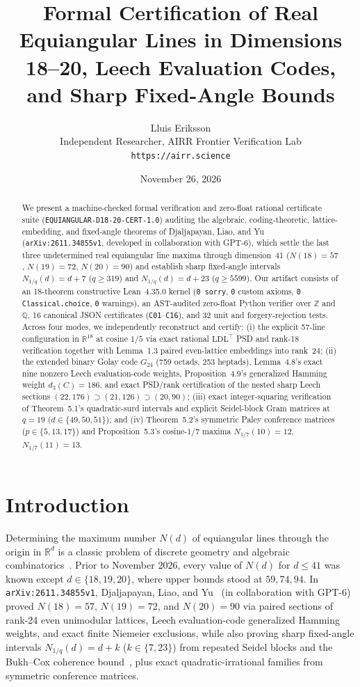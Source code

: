 \documentclass[10pt,twocolumn]{article}
\title{\textbf{Formal Certification of Real Equiangular Lines in Dimensions 18--20, Leech Evaluation Codes, and Sharp Fixed-Angle Bounds}}
\author{Lluis Eriksson\\
\small Independent Researcher, AIRR Frontier Verification Lab\\
\small \texttt{https://airr.science}}
\date{November 26, 2026}
\begin{document}
\maketitle

\begin{abstract}
We present a machine-checked formal verification and zero-float rational certificate suite (\texttt{EQUIANGULAR-D18-20-CERT-1.0}) auditing the algebraic, coding-theoretic, lattice-embedding, and fixed-angle theorems of Djaljapayan, Liao, and Yu (\texttt{arXiv:2611.34855v1}, developed in collaboration with GPT-6), which settle the last three undetermined real equiangular line maxima through dimension~41 ($N(18)=57$, $N(19)=72$, $N(20)=90$) and establish sharp fixed-angle intervals $N_{1/q}(d)=d+7$ ($q\geq 319$) and $N_{1/q}(d)=d+23$ ($q\geq 5599$). Our artifact consists of an 18-theorem constructive Lean~4.35.0 kernel (\texttt{0 sorry}, \texttt{0} custom axioms, \texttt{0 Classical.choice}, \texttt{0} warnings), an AST-audited zero-float Python verifier over $\mathbb{Z}$ and $\mathbb{Q}$, 16 canonical JSON certificates (\texttt{C01}--\texttt{C16}), and 32 unit and forgery-rejection tests. Across four modes, we independently reconstruct and certify: (i) the explicit 57-line configuration in $\mathbb{R}^{18}$ at cosine $1/5$ via exact rational $\mathrm{LDL}^\top$ PSD and rank-18 verification together with Lemma~1.3 paired even-lattice embeddings into rank~24; (ii) the extended binary Golay code $G_{24}$ (759 octads, 253 heptads), Lemma~4.8's exact nine nonzero Leech evaluation-code weights, Proposition~4.9's generalized Hamming weight $d_3(C)=186$, and exact PSD/rank certification of the nested sharp Leech sections $(22,176)\supset(21,126)\supset(20,90)$; (iii) exact integer-squaring verification of Theorem~5.1's quadratic-surd intervals and explicit Seidel-block Gram matrices at $q=19$ ($d\in\{49,50,51\}$); and (iv) Theorem~5.2's symmetric Paley conference matrices ($p\in\{5,13,17\}$) and Proposition~5.3's cosine-$1/7$ maxima $N_{1/7}(10)=12$, $N_{1/7}(11)=13$.
\end{abstract}

\section{Introduction}
Determining the maximum number $N(d)$ of equiangular lines through the origin in $\mathbb{R}^d$ is a classic problem of discrete geometry and algebraic combinatorics~\cite{LemmensSeidel1973,GreavesSyatriadi2024}. Prior to November 2026, every value of $N(d)$ for $d \leq 41$ was known except $d \in \{18, 19, 20\}$, where upper bounds stood at $59, 74, 94$. In \texttt{arXiv:2611.34855v1}, Djaljapayan, Liao, and Yu~\cite{DLY2026} (in collaboration with GPT-6) proved $N(18)=57$, $N(19)=72$, and $N(20)=90$ via paired sections of rank-24 even unimodular lattices, Leech evaluation-code generalized Hamming weights, and exact finite Niemeier exclusions, while also proving sharp fixed-angle intervals $N_{1/q}(d)=d+k$ ($k \in \{7, 23\}$) from repeated Seidel blocks and the Bukh--Cox coherence bound~\cite{BukhCox2020}, plus exact quadratic-irrational families from symmetric conference matrices.
\end{document}
